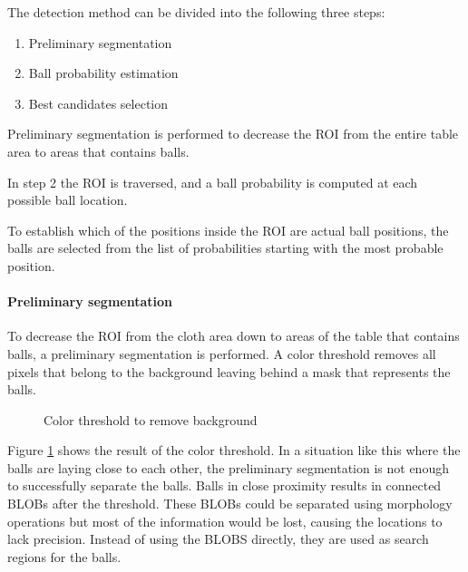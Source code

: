 The detection method can be divided into the following three steps:
\begin{enumerate}
  \item Preliminary segmentation
  \item Ball probability estimation
  \item Best candidates selection
\end{enumerate}

Preliminary segmentation is performed to decrease the ROI from the entire table area to areas that contains balls.

In step 2 the ROI is traversed, and a ball probability is computed at each possible ball location. 

To establish which of the positions inside the ROI are actual ball positions, the balls are selected from the list of probabilities starting with the most probable position.

\paragraph{Preliminary segmentation}
To decrease the ROI from the cloth area down to areas of the table that contains balls, a preliminary segmentation is performed. A color threshold removes all pixels that belong to the background leaving behind a mask that represents the balls.
\begin{figure}[H]
  \centering
  \quad           
   \caption{Color threshold to remove background}
  \label{fig:thres1}
\end{figure}
Figure \ref{fig:thres1} shows the result of the color threshold. In a situation like this where the balls are laying close to each other, the preliminary segmentation is not enough to successfully separate the balls. Balls in close proximity results in connected BLOBs after the threshold. These BLOBs could be separated using morphology operations but most of the information would be lost, causing the locations to lack precision. Instead of using the BLOBS directly, they are used as search regions for the balls.

